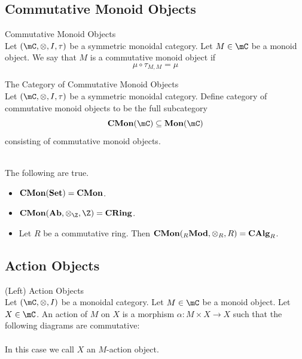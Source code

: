 \documentclass[a4paper]{article}
\begin{document}
\subsection{Commutative Monoid Objects}
\begin{defn}{Commutative Monoid Objects}{}\\
Let $(\mC,\otimes,I,\tau)$ be a symmetric monoidal category. Let $M\in\mC$ be a monoid object. We say that $M$ is a commutative monoid object if $$\mu\circ\tau_{M,M}=\mu$$
\end{defn}

\begin{defn}{The Category of Commutative Monoid Objects}{}\\
Let $(\mC,\otimes,I,\tau)$ be a symmetric monoidal category. Define category of commutative monoid objects to be the full subcategory $$\bold{CMon}(\mC)\subseteq\bold{Mon}(\mC)$$ consisting of commutative monoid objects. 
\end{defn}

\begin{eg}{}{}\\
The following are true. 
\begin{itemize}
\item $\bold{CMon}(\bold{Set})=\bold{CMon}$. 
\item $\bold{CMon}(\bold{Ab},\otimes_\Z,\Z)=\bold{CRing}$. 
\item Let $R$ be a commutative ring. Then $\bold{CMon}({_R}\bold{Mod},\otimes_R,R)=\bold{CAlg}_R$. 
\end{itemize}
\end{eg}

\subsection{Action Objects}
\begin{defn}{(Left) Action Objects}{}\\
Let $(\mC,\otimes,I)$ be a monoidal category. Let $M\in\mC$ be a monoid object. Let $X\in\mC$. An action of $M$ on $X$ is a morphism $\alpha:M\times X\to X$ such that the following diagrams are commutative: \\
\\
In this case we call $X$ an $M$-action object. 
\end{defn}
\end{document}
